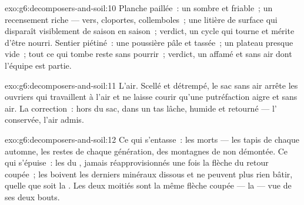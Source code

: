 \begin{solution}{exo:g6:decomposers-and-soil:10}
Planche paillée~: un  sombre et friable~; un recensement riche
--- vers, cloportes, collemboles~; une litière de surface qui
disparaît visiblement de saison en saison~; verdict, un cycle qui
tourne et mérite d'être nourri. Sentier piétiné~: une poussière pâle
et tassée~; un plateau presque vide~; tout ce qui tombe reste sans
pourrir~; verdict, un  affamé et sans air dont l'équipe est
partie.
\end{solution}

\begin{solution}{exo:g6:decomposers-and-soil:11}
L'air. Scellé et détrempé, le sac sans air arrête les ouvriers qui
travaillent à l'air et ne laisse courir qu'une putréfaction aigre et
sans air. La correction~: hors du sac, dans un tas lâche, humide et
retourné --- l' conservée, l'air admis.
\end{solution}

\begin{solution}{exo:g6:decomposers-and-soil:12}
Ce qui s'entasse~: les morts --- les tapis de chaque automne, les
restes de chaque génération, des montagnes de  non
démontée. Ce qui s'épuise~: les  du , jamais
réapprovisionnés une fois la flèche du retour coupée~; les
 boivent les derniers minéraux dissous et ne peuvent plus
rien bâtir, quelle que soit la . Les deux moitiés sont la
même flèche coupée --- la  --- vue de ses deux bouts.
\end{solution}

